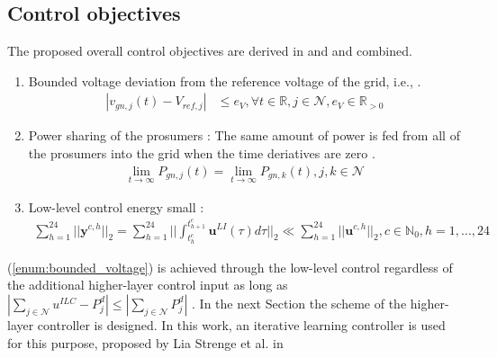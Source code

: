 \subsection{Control objectives}
\label{subsec:conobj}
The proposed overall control objectives are derived in \cite{paperilc} and \cite{lia_master} and combined. 
\begin{enumerate}[(1)]
	\item \label{enum:bounded_voltage} Bounded voltage deviation from the reference voltage of the grid, i.e., \cite{lia_master}.
	\begin{align}
	|v_{gn,j}(t)-V_{ref,j}| &\leq e_V, \forall t \in \mathbb{R}, j \in \mathcal{N}, e_V \in \mathbb{R}_{>0}
	\end{align}
	\item \label{enum:power_sharing} Power sharing of the prosumers \cite{lia_master}: The same amount of power is fed from all of the prosumers into the grid when the time deriatives are zero \cite{lia_master}.
	\begin{align}
	\lim_{t\rightarrow \infty} P_{gn,j}(t) = \lim_{t\rightarrow \infty} P_{gn,k}(t), j,k\in\mathcal{N}
	\end{align}
	\item \label{enum:llc_small} Low-level control energy small \cite{paperilc}: 
	\begin{align}
	\sum_{h=1}^{24} || \textbf{y}^{c,h}||_2 = \sum_{h=1}^{24} || \int_{t^c_h}^{t^c_{h+1}} \textbf{u}^{LI}(\tau) d\tau ||_2 \ll \sum_{h=1}^{24} ||\textbf{u}^{c,h}||_2, c \in \mathbb{N}_0, h=1,...,24
	\end{align} 
\end{enumerate}
(\ref{enum:bounded_voltage}) is achieved through the low-level control regardless of the additional higher-layer control input as long as $|\sum_{j\in \mathcal{N}}u^{ILC}-P^d_j| \leq |\sum_{j\in \mathcal{N}}P^d_j|$ \cite{paperilc}. In the next Section the scheme of the higher-layer controller is designed. In this work, an iterative learning controller is used for this purpose, proposed by Lia Strenge et al. in \cite{paperilc}
